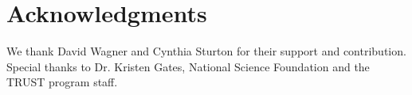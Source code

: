 \section{Acknowledgments}
We thank David Wagner and Cynthia Sturton for their support and contribution.  Special thanks to Dr. Kristen Gates, National Science Foundation and the TRUST program staff.
